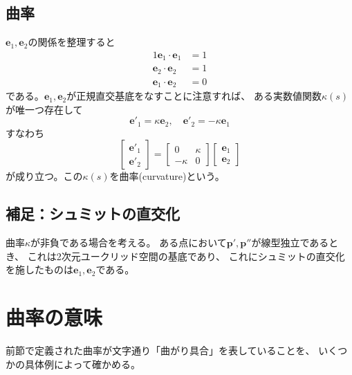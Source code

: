 \documentclass[a4j,disablejfam,dvipdfmx,papersize,slide,uplatex,21pt]{jsarticle}
\begin{document}
\subsection*{曲率}
$\bm{e}_1, \bm{e}_2$の関係を整理すると
\begin{alignat}{1}
    \bm{e}_1 \cdot \bm{e}_1 &= 1 \\
    \bm{e}_2 \cdot \bm{e}_2 &= 1 \\
    \bm{e}_1 \cdot \bm{e}_2 &= 0
\end{alignat}
である。$\bm{e}_1, \bm{e}_2$が正規直交基底をなすことに注意すれば、
ある実数値関数$\kappa(s)$が唯一つ存在して
\begin{equation}
    \bm{e}'_1 = \kappa \bm{e}_2,\quad
    \bm{e}'_2 = - \kappa \bm{e}_1
\end{equation}
すなわち
\begin{equation}
    \left[
        \begin{array}{c}
            \bm{e}'_1 \\
            \bm{e}'_2
        \end{array}
    \right]
    =
    \left[
        \begin{array}{cc}
            0 & \kappa \\
            -\kappa & 0
        \end{array}
    \right]
    \left[
        \begin{array}{c}
            \bm{e}_1 \\
            \bm{e}_2
        \end{array}
    \right]
\end{equation}
が成り立つ。この$\kappa(s)$を曲率(curvature)という。

\newpage
\subsection*{補足：シュミットの直交化}
曲率$\kappa$が非負である場合を考える。
ある点において$\bm{p}', \bm{p}''$が線型独立であるとき、
これは2次元ユークリッド空間の基底であり、
これにシュミットの直交化を施したものは$\bm{e}_1, \bm{e}_2$である。




\section{曲率の意味}
前節で定義された曲率が文字通り「曲がり具合」を表していることを、
いくつかの具体例によって確かめる。

\newpage
\end{document}
